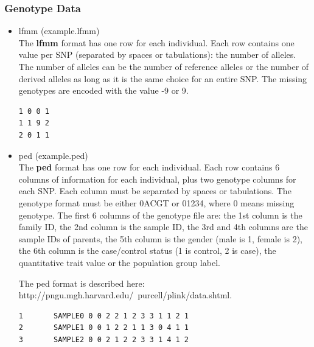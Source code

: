 \documentclass[10pt,a4paper]{article}
\begin{document}
\subsubsection{Genotype Data}
\begin{itemize}
\item lfmm (example.lfmm)\\
The {\bf lfmm} format has one row for each individual. Each row contains
one value per SNP (separated by spaces or tabulations): the number of alleles.
The number of alleles can be the number of reference alleles or the number
of derived alleles as long as it is the same choice for an entire SNP. The missing
genotypes are encoded with the value -9 or 9.

\begin{center}
\footnotesize
\begin{Verbatim}[frame=single]
1 0 0 1
1 1 9 2
2 0 1 1
\end{Verbatim}
\end{center}

\item ped (example.ped) \\
The {\bf ped} format has one row for each individual. Each row contains 6 columns of information for each individual, plus two genotype columns for each SNP. Each column must be separated by spaces or tabulations. The genotype format must be either 0ACGT or 01234, where 0 means missing genotype. The first 6 columns of the genotype file are: the 1st column is the family ID, the 2nd column is the sample ID, the 3rd and 4th columns are the sample IDs of parents, the 5th column is the gender (male is 1, female is 2), the 6th column is the case/control status (1 is control, 2 is case), the quantitative trait value or the population group label.

The ped format is described here: http://pngu.mgh.harvard.edu/~purcell/plink/data.shtml.

\begin{center}
\footnotesize
\begin{Verbatim}[frame=single]
1       SAMPLE0 0 0 2 2 1 2 3 3 1 1 2 1
2       SAMPLE1 0 0 1 2 2 1 1 3 0 4 1 1
3       SAMPLE2 0 0 2 1 2 2 3 3 1 4 1 2
\end{Verbatim}
\end{center}


\end{itemize}
\end{document}
